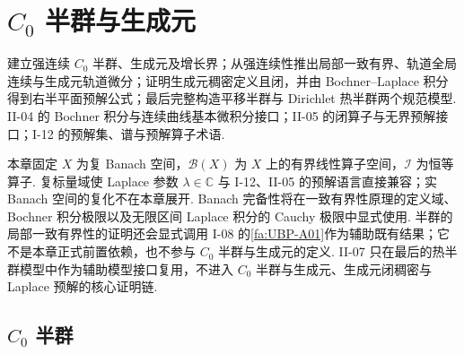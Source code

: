 \chapter{\texorpdfstring{\(\displaystyle C_0\)}{C0} 半群与生成元}\label{chap:II-08}
\FAChapterOpening
{建立强连续 \(\displaystyle C_0\) 半群、生成元及增长界；从强连续性推出局部一致有界、轨道全局连续与生成元轨道微分；证明生成元稠密定义且闭，并由 Bochner--Laplace 积分得到右半平面预解公式；最后完整构造平移半群与 Dirichlet 热半群两个规范模型.}
{II-04 的 Bochner 积分与连续曲线基本微积分接口；II-05 的闭算子与无界预解接口；I-12 的预解集、谱与预解算子术语.}
{\begin{center}
\end{center}}

本章固定 \(\displaystyle X\) 为复 Banach 空间，\(\displaystyle\mathcal B(X)\) 为 \(\displaystyle X\) 上的有界线性算子空间，\(\displaystyle\mathcal I\) 为恒等算子. 复标量域使 Laplace 参数 \(\displaystyle\lambda\in\mathbb C\) 与 I-12、II-05 的预解语言直接兼容；实 Banach 空间的复化不在本章展开. Banach 完备性将在一致有界性原理的定义域、Bochner 积分极限以及无限区间 Laplace 积分的 Cauchy 极限中显式使用. 半群的局部一致有界性的证明还会显式调用 I-08 的\autoref{fa:UBP-A01}作为辅助既有结果；它不是本章正式前置依赖，也不参与 \(\displaystyle C_0\) 半群与生成元的定义. II-07 只在最后的热半群模型中作为辅助模型接口复用，不进入 \(\displaystyle C_0\) 半群与生成元、生成元闭稠密与 Laplace 预解的核心证明链.

\section{\texorpdfstring{\(\displaystyle C_0\)}{C0} 半群}\label{sec:ii08-c0-semigroup}

